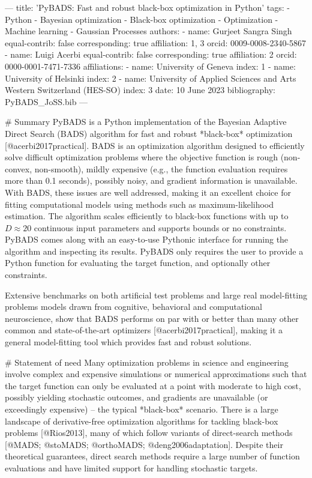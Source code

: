 \documentclass{article}
\begin{document}
\begin{markdown}
---
title: 'PyBADS: Fast and robust black-box optimization in Python'
tags:
  - Python
  - Bayesian optimization
  - Black-box optimization
  - Optimization
  - Machine learning
  - Gaussian Processes
authors:
  - name: Gurjeet Sangra Singh
    equal-contrib: false
    corresponding: true
    affiliation: 1, 3
    orcid: 0009-0008-2340-5867
  - name: Luigi Acerbi
    equal-contrib: false
    corresponding: true
    affiliation: 2
    orcid: 0000-0001-7471-7336
affiliations:
  - name: University of Geneva
    index: 1
  - name: University of Helsinki
    index: 2
  - name: University of Applied Sciences and Arts Western Switzerland (HES-SO)
    index: 3
date: 10 June 2023
bibliography: PyBADS_JoSS.bib
---

# Summary
PyBADS is a Python implementation of the Bayesian Adaptive Direct Search (BADS) algorithm for fast and robust *black-box* optimization [@acerbi2017practical]. BADS is an optimization algorithm designed to efficiently solve difficult optimization problems where the objective function is rough (non-convex, non-smooth), mildly expensive (e.g., the function evaluation requires more than 0.1 seconds), possibly noisy, and gradient information is unavailable. With BADS, these issues are well addressed, making it an excellent choice for fitting computational models using methods such as maximum-likelihood estimation.
The algorithm scales efficiently to black-box functions with up to $D \approx 20$ continuous input parameters and supports bounds or no constraints. PyBADS comes along with an easy-to-use Pythonic interface for running the algorithm and inspecting its results. PyBADS only requires the user to provide a Python function for evaluating the target function, and optionally other constraints.

Extensive benchmarks on both artificial test problems and large real model-fitting problems models drawn from cognitive, behavioral and computational neuroscience, show that BADS performs on par with or better than many other common and state-of-the-art optimizers [@acerbi2017practical], making it a general model-fitting tool which provides fast and robust solutions. 

# Statement of need
Many optimization problems in science and engineering involve complex and expensive simulations or numerical approximations such that the target function can only be evaluated at a point with moderate to high cost, possibly yielding stochastic outcomes, and gradients are unavailable (or exceedingly expensive) -- the typical *black-box* scenario. There is a large landscape of derivative-free optimization algorithms for tackling black-box problems  [@Rios2013], many of which follow variants of direct-search methods [@MADS; @stoMADS; @orthoMADS; @deng2006adaptation].
Despite their theoretical guarantees, direct search methods require a large number of function evaluations and have limited support for handling stochastic targets. 


\end{markdown}
\end{document}
